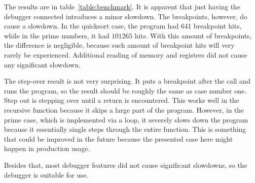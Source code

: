 The results are in table~\ref{table:benchmark}. It is apparent that just having
the debugger connected introduces a minor slowdown. The breakpoints, however,
do cause a slowdown. In the quicksort case, the program had $641$ breakpoint
hits, while in the prime numbers, it had $101265$ hits. With this amount  of
breakpoints, the difference is negligible, because such amount of breakpoint
hits will very rarely be experienced. Additional reading of memory and
registers did not cause any significant slowdown.

The step-over result is not very surprising. It puts a breakpoint after the
call and runs the program, so the result should be roughly the same as case
number one. Step out is stepping over until a return is encountered. This works
well in the recursive function because it skips a large part of the program.
However, in the prime case, which is implemented via a loop, it severely slows
down the program because it essentially single steps through the entire
function. This is something that could be improved in the future because the
presented case here might happen in production usage.

Besides that, most debugger features did not cause significant slowdowns, so
the debugger is suitable for use.
